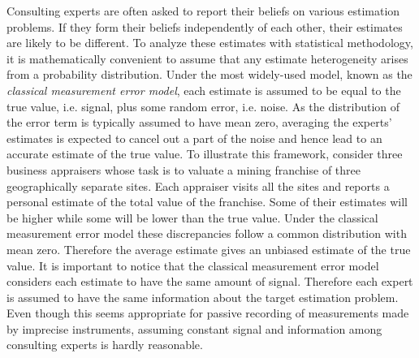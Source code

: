 \documentclass[11pt,twoside]{article}
\theoremstyle{definition}
\theoremstyle{definition}
\begin{document}
Consulting experts are often asked to report their beliefs on various estimation problems. If they form their beliefs independently of each
other, their estimates are likely to be different. To analyze these
estimates with statistical methodology, it is mathematically
convenient to assume that any estimate heterogeneity arises
from a probability distribution. Under the most widely-used model, known as the \textit{classical measurement error model}, each estimate is assumed to be equal to the true value, i.e. signal, plus some random error, i.e. noise. As the distribution of the error term is typically assumed to have mean zero, averaging the experts' estimates is expected to cancel out a part of the noise and hence lead to an accurate estimate of the true value. To illustrate this framework, consider three business appraisers whose task is to valuate a mining franchise of three geographically separate sites. Each appraiser visits all the sites and reports a personal estimate of the total value of the franchise. Some of their estimates will be higher while some will be lower than the true value. Under the classical measurement error model these discrepancies follow a common distribution with mean zero. Therefore the average estimate gives an unbiased estimate of the true value. It is important to notice that the classical measurement error model considers each estimate to have the same amount of signal. Therefore each expert is assumed to have the same information about the target estimation problem. Even though this seems appropriate for passive recording of measurements made by imprecise instruments, assuming constant signal and information among consulting experts is hardly reasonable. 
\end{document}
